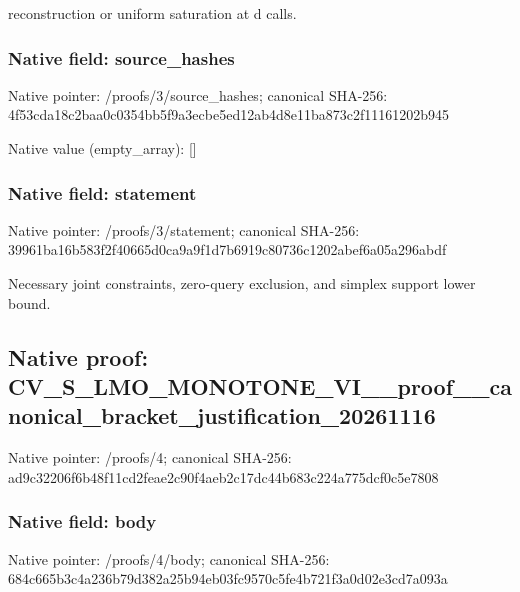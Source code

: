 \documentclass[10pt,a4paper]{article}
\begin{document}
reconstruction or uniform saturation at d calls.\par\endgroup

\subsubsection{Native field: source\_\allowbreak{}hashes}
Native pointer: /proofs/3/source\_\allowbreak{}hashes; canonical SHA-256: 4f53cda18c2baa0c0354bb5f9a3ecbe5ed12ab4d8e11ba873c2f11161202b945

Native value (empty\_\allowbreak{}array): []

\subsubsection{Native field: statement}
Native pointer: /proofs/3/statement; canonical SHA-256: 39961ba16b583f2f40665d0ca9a9f1d7b6919c80736c1202abef6a05a296abdf

\begingroup\raggedright\sloppy Necessary joint constraints,\allowbreak{} zero-query exclusion,\allowbreak{} and simplex support lower bound.\par\endgroup

\subsection{Native proof: CV\_\allowbreak{}S\_\allowbreak{}LMO\_\allowbreak{}MONOTONE\_\allowbreak{}VI\_\allowbreak{}\_\allowbreak{}proof\_\allowbreak{}\_\allowbreak{}canonical\_\allowbreak{}bracket\_\allowbreak{}justification\_\allowbreak{}20261116}
Native pointer: /proofs/4; canonical SHA-256: ad9c32206f6b48f11cd2feae2c90f4aeb2c17dc44b683c224a775dcf0c5e7808

\subsubsection{Native field: body}
Native pointer: /proofs/4/body; canonical SHA-256: 684c665b3c4a236b79d382a25b94eb03fc9570c5fe4b721f3a0d02e3cd7a093a
\end{document}
